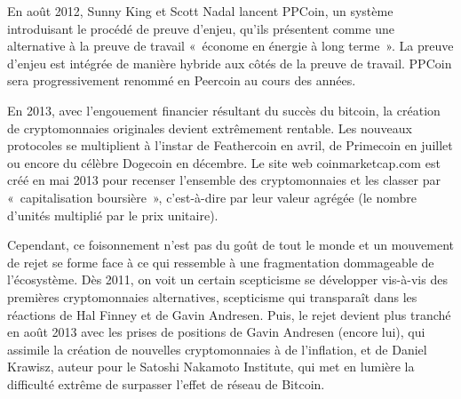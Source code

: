En août 2012, Sunny King et Scott Nadal lancent PPCoin, un système introduisant le procédé de preuve d'enjeu, qu'ils présentent comme une alternative à la preuve de travail «~économe en énergie à long terme~». La preuve d'enjeu est intégrée de manière hybride aux côtés de la preuve de travail. PPCoin sera progressivement renommé en Peercoin au cours des années.


En 2013, avec l'engouement financier résultant du succès du bitcoin, la création de cryptomonnaies originales devient extrêmement rentable. Les nouveaux protocoles se multiplient à l'instar de Feathercoin en avril, de Primecoin en juillet ou encore du célèbre Dogecoin en décembre. Le site web coinmarketcap.com est créé en mai 2013 pour recenser l'ensemble des cryptomonnaies et les classer par «~capitalisation boursière~», c'est-à-dire par leur valeur agrégée (le nombre d'unités multiplié par le prix unitaire).

Cependant, ce foisonnement n'est pas du goût de tout le monde et un mouvement de rejet se forme face à ce qui ressemble à une fragmentation dommageable de l'écosystème. Dès 2011, on voit un certain scepticisme se développer vis-à-vis des premières cryptomonnaies alternatives, scepticisme qui transparaît dans les réactions de Hal Finney et de Gavin Andresen. Puis, le rejet devient plus tranché en août 2013 avec les prises de positions de Gavin Andresen (encore lui), qui assimile la création de nouvelles cryptomonnaies à de l'inflation, et de Daniel Krawisz, auteur pour le Satoshi Nakamoto Institute, qui met en lumière la difficulté extrême de surpasser l'effet de réseau de Bitcoin.

